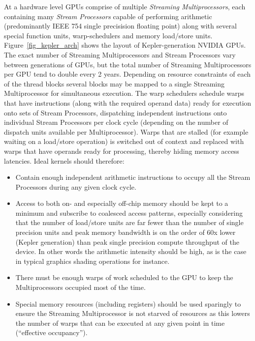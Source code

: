 At a hardware level GPUs comprise of multiple \textit{Streaming Multiprocessors}, each containing many \textit{Stream Processors} capable of performing arithmetic (predominantly IEEE 754 single precisision floating point) along
with several special function units, warp-schedulers and memory load/store units. Figure~\ref{fig_kepler_arch} shows the layout of Kepler-generation NVIDIA GPUs. The exact number of Streaming Multiprocessors and Stream Processors
vary between generations of GPUs, but the total number of Streaming Multiprocessors per GPU tend to double every 2 years. Depending on resource constraints of each of the thread blocks several blocks may be mapped to a single 
Streaming Multiprocessor for simultaneous execution. The warp schedulers schedule warps that have instructions (along with the required operand data) ready for execution onto sets of Stream Processors, dispatching independent 
instructions onto individual Stream Processors per clock cycle (depending on the number of dispatch units available per Multiprocessor). Warps that are stalled (for example waiting on a load/store operation) is switched out of context
and replaced with warps that have operands ready for processing, thereby hiding memory access latencies. Ideal kernels should therefore:
\begin{itemize}
 \item Contain enough independent arithmetic instructions to occupy all the Stream Processors during
       any given clock cycle.
 \item Access to both on- and especially off-chip memory should be kept to a minimum and subscribe to coalesced access patterns, especially considering that the number of load/store units are far fewer than the number of
       single precision units and peak memory bandwidth is on the order of 60x lower (Kepler generation) than peak single precision compute throughput of the device. In other words the arithmetic intensity should be high, as
       is the case in typical graphics shading operations for instance.
 \item There must be enough warps of work scheduled to the GPU to keep the Multiprocessors occupied most of the time.
 \item Special memory resources (including registers) should be used sparingly to ensure the Streaming Multiprocessor is not starved of resources as this lowers the number of warps that can be executed at any given point in time 
      (``effective occupancy'').
\end{itemize}
